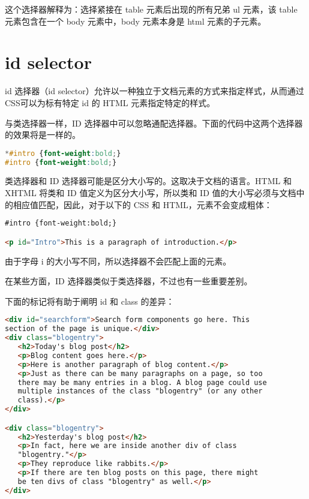 这个选择器解释为：选择紧接在 table 元素后出现的所有兄弟 ul 元素，该 table 元素包含在一个 body 元素中，body 元素本身是 html 元素的子元素。


\section{id selector}

id 选择器（id selector）允许以一种独立于文档元素的方式来指定样式，从而通过CSS可以为标有特定 id 的 HTML 元素指定特定的样式。

与类选择器一样，ID 选择器中可以忽略通配选择器。下面的代码中这两个选择器的效果将是一样的。

\begin{lstlisting}[language=CSS]
*#intro {font-weight:bold;}
#intro {font-weight:bold;}
\end{lstlisting}

类选择器和 ID 选择器可能是区分大小写的。这取决于文档的语言。HTML 和 XHTML 将类和 ID 值定义为区分大小写，所以类和 ID 值的大小写必须与文档中的相应值匹配，因此，对于以下的 CSS 和 HTML，元素不会变成粗体：

\begin{lstlisting}[language=HTML]
#intro {font-weight:bold;}

<p id="Intro">This is a paragraph of introduction.</p>
\end{lstlisting}

由于字母 i 的大小写不同，所以选择器不会匹配上面的元素。

在某些方面，ID 选择器类似于类选择器，不过也有一些重要差别。

下面的标记将有助于阐明 id 和 class 的差异：

\begin{lstlisting}[language=HTML]
<div id="searchform">Search form components go here. This
section of the page is unique.</div>
<div class="blogentry">
   <h2>Today's blog post</h2>
   <p>Blog content goes here.</p>
   <p>Here is another paragraph of blog content.</p>
   <p>Just as there can be many paragraphs on a page, so too
   there may be many entries in a blog. A blog page could use
   multiple instances of the class "blogentry" (or any other
   class).</p>
</div>

<div class="blogentry">
   <h2>Yesterday's blog post</h2>
   <p>In fact, here we are inside another div of class
   "blogentry."</p>
   <p>They reproduce like rabbits.</p>
   <p>If there are ten blog posts on this page, there might
   be ten divs of class "blogentry" as well.</p>
</div>
\end{lstlisting}

